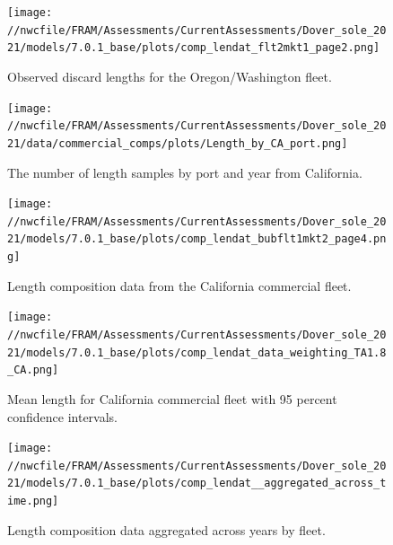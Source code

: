 \documentclass[11pt,
  english,
  a4paper,
]{article}
\begin{document}
\begin{figure}
\centering
\texttt{[image: //nwcfile/FRAM/Assessments/CurrentAssessments/Dover\_sole\_2021/models/7.0.1\_base/plots/comp\_lendat\_flt2mkt1\_page2.png]}
\caption{Observed discard lengths for the Oregon/Washington fleet.\label{fig:orwa-disc-len-ob-2}}
\end{figure}

\tagmcend\tagstructend


\begin{figure}
\centering
\texttt{[image: //nwcfile/FRAM/Assessments/CurrentAssessments/Dover\_sole\_2021/data/commercial\_comps/plots/Length\_by\_CA\_port.png]}
\caption{The number of length samples by port and year from California.\label{fig:ca-len-port}}
\end{figure}

\tagmcend\tagstructend


\begin{figure}
\centering
\texttt{[image: //nwcfile/FRAM/Assessments/CurrentAssessments/Dover\_sole\_2021/models/7.0.1\_base/plots/comp\_lendat\_bubflt1mkt2\_page4.png]}
\caption{Length composition data from the California commercial fleet.\label{fig:ca-len-data}}
\end{figure}

\tagmcend\tagstructend


\begin{figure}
\centering
\texttt{[image: //nwcfile/FRAM/Assessments/CurrentAssessments/Dover\_sole\_2021/models/7.0.1\_base/plots/comp\_lendat\_data\_weighting\_TA1.8\_CA.png]}
\caption{Mean length for California commercial fleet with 95 percent confidence intervals.\label{fig:mean-ca-len-data}}
\end{figure}

\tagmcend\tagstructend


\begin{figure}
\centering
\texttt{[image: //nwcfile/FRAM/Assessments/CurrentAssessments/Dover\_sole\_2021/models/7.0.1\_base/plots/comp\_lendat\_\_aggregated\_across\_time.png]}
\caption{Length composition data aggregated across years by fleet.\label{fig:agg-len-data}}
\end{figure}
\end{document}
